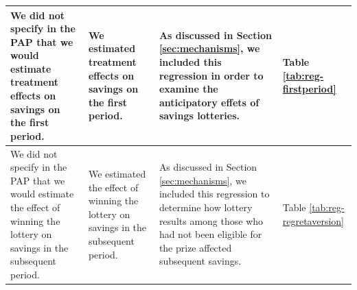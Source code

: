 \documentclass[12pt, titlepage]{article}
\begin{document}
\begin{landscape}
\begin{longtable}{p{}p{}p{}p{}}
			\midrule
			We did not specify in the PAP that we would estimate treatment effects on savings on the first period. & We estimated treatment effects on savings on the first period. & As discussed in Section \ref{sec:mechanisms}, we included this regression in order to examine the anticipatory effets of savings lotteries. & Table \ref{tab:reg-firstperiod} \\
			\midrule
			We did not specify in the PAP that we would estimate the effect of winning the lottery on savings in the subsequent period. & We estimated the effect of winning the lottery on savings in the subsequent period. & As discussed in Section \ref{sec:mechanisms}, we included this regression to determine how lottery results among those who had not been eligible for the prize affected subsequent savings. & Table \ref{tab:reg-regretaversion} \\
		\end{longtable}

	\end{landscape}

	
	
	
	
	

	\clearpage
\end{document}
